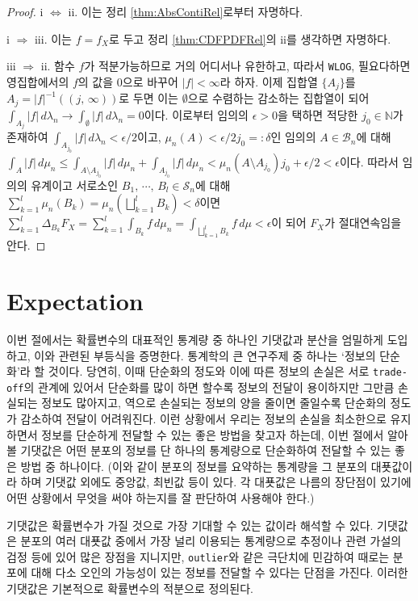 \begin{proof}
    i $\Leftrightarrow$ ii. 이는 정리 \ref{thm:AbsContiRel}로부터 자명하다.

    i $\Rightarrow$ iii. 이는 $f=f_X$로 두고 정리 \ref{thm:CDFPDFRel}의 ii를 생각하면 자명하다.

    iii $\Rightarrow$ ii. 함수 $f$가 적분가능하므로 거의 어디서나 유한하고, 따라서 \texttt{WLOG}, 필요다하면 영집합에서의 $f$의 값을 $0$으로 바꾸어 $|f|<\infty$라 하자. 이제 집합열 $\{A_j\}$를 $A_j=|f|^{-1}((j,\,\infty))$로 두면 이는 $\emptyset$으로 수렴하는 감소하는 집합열이 되어 $\int_{A_j}|f|\,d\lambda_n\to\int_\emptyset|f|\,d\lambda_n=0$이다. 이로부터 임의의 $\epsilon>0$을 택하면 적당한 $j_0\in\mathbb{N}$가 존재하여 $\int_{A_{j_0}}|f|\,d\lambda_n<\epsilon/2$이고, $\mu_n(A)<\epsilon/2j_0=:\delta$인 임의의 $A\in\mathcal{B}_n$에 대해 $\int_A|f|\,d\mu_n\leq\int_{A\setminus A_{j_0}}|f|\,d\mu_n+\int_{A_{j_0}}|f|\,d\mu_n<\mu_n(A\setminus A_{j_0})j_0+\epsilon/2<\epsilon$이다. 따라서 임의의 유계이고 서로소인 $B_1,\,\cdots,\,B_l\in\mathcal{S}_n$에 대해 $\sum_{k=1}^l\mu_n(B_k)=\mu_n(\bigsqcup_{k=1}^lB_k)<\delta$이면 $\sum_{k=1}^l\Delta_{B_k}F_X=\sum_{k=1}^l\int_{B_k}f\,d\mu_n=\int_{\bigsqcup_{k=1}^lB_k}f\,d\mu<\epsilon$이 되어 $F_X$가 절대연속임을 안다.
\end{proof}

\section{Expectation}

이번 절에서는 확률변수의 대표적인 통계량 중 하나인 기댓값과 분산을 엄밀하게 도입하고, 이와 관련된 부등식을 증명한다. 통계학의 큰 연구주제 중 하나는 `정보의 단순화'라 할 것이다. 당연히, 이때 단순화의 정도와 이에 따른 정보의 손실은 서로 \texttt{trade-off}의 관계에 있어서 단순화를 많이 하면 할수록 정보의 전달이 용이하지만 그만큼 손실되는 정보도 많아지고, 역으로 손실되는 정보의 양을 줄이면 줄일수록 단순화의 정도가 감소하여 전달이 어려워진다. 이런 상황에서 우리는 정보의 손실을 최소한으로 유지하면서 정보를 단순하게 전달할 수 있는 좋은 방법을 찾고자 하는데, 이번 절에서 알아볼 기댓값은 어떤 분포의 정보를 단 하나의 통계량으로 단순화하여 전달할 수 있는 좋은 방법 중 하나이다. (이와 같이 분포의 정보를 요약하는 통계량을 그 분포의 대푯값이라 하며 기댓값 외에도 중앙값, 최빈값 등이 있다. 각 대푯값은 나름의 장단점이 있기에 어떤 상황에서 무엇을 써야 하는지를 잘 판단하여 사용해야 한다.) 

기댓값은 확률변수가 가질 것으로 가장 기대할 수 있는 값이라 해석할 수 있다. 기댓값은 분포의 여러 대푯값 중에서 가장 널리 이용되는 통계량으로 추정이나 관련 가설의 검정 등에 있어 많은 장점을 지니지만, \texttt{outlier}와 같은 극단치에 민감하여 때로는 분포에 대해 다소 오인의 가능성이 있는 정보를 전달할 수 있다는 단점을 가진다. 이러한 기댓값은 기본적으로 확률변수의 적분으로 정의된다.

